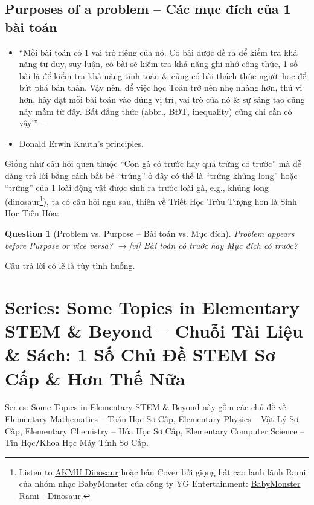 \documentclass[12pt,twoside]{book}
\newtheorem{question}{Question}
\begin{document}
\subsection{Purposes of a problem -- Các mục đích của 1 bài toán}

\begin{itemize}
	\item ``Mỗi bài toán có 1 vai trò riêng của nó. Có bài được đề ra để kiểm tra khả năng tư duy, suy luận, có bài sẽ kiểm tra khả năng ghi nhớ công thức, 1 số bài là để kiểm tra khả năng tính toán \& cũng có bài thách thức người học để bứt phá bản thân. Vậy nên, để việc học Toán trở nên nhẹ nhàng hơn, thú vị hơn, hãy đặt mỗi bài toán vào đúng vị trí, vai trò của nó \& sự sáng tạo cũng nảy mầm từ đây. Bất đẳng thức (abbr., BĐT, inequality) cũng chỉ cần có vậy!'' -- \cite[Lời nói đầu, p. 3]{Anh_Quang_bdt_lem}
	\item {\sc Donald Erwin Knuth}'s principles.
\end{itemize}
Giống như câu hỏi quen thuộc ``Con gà có trước hay quả trứng có trước'' mà dễ dàng trả lời bằng cách bắt bẻ ``trứng'' ở đây có thể là ``trứng khủng long'' hoặc ``trứng'' của 1 loài động vật được sinh ra trước loài gà, e.g., khủng long (dinosaur\footnote{Listen to \href{https://www.youtube.com/watch?v=8Oz7DG76ibY}{AKMU Dinosaur} hoặc bản Cover bởi giọng hát cao lanh lãnh {\sc Rami} của nhóm nhạc {\sc BabyMonster} của công ty YG Entertainment: \href{https://www.youtube.com/watch?v=ZBXTKTeaJcA}{{\sc BabyMonster Rami} - Dinosaur}.}), ta có câu hỏi ngu sau, thiên về Triết Học Trừu Tượng hơn là Sinh Học Tiến Hóa:

\begin{question}[Problem vs. Purpose -- Bài toán vs. Mục đích]
	Problem appears before Purpose or vice versa? {\sf[en]$\to$[vi]} Bài toán có trước hay Mục đích có trước?
\end{question}
Câu trả lời có lẽ là tùy tình huống. 


\section{Series: Some Topics in Elementary STEM \& Beyond -- Chuỗi Tài Liệu \& Sách: 1 Số Chủ Đề STEM Sơ Cấp \& Hơn Thế Nữa}
Series: Some Topics in Elementary STEM \& Beyond này gồm các chủ đề về Elementary Mathematics -- Toán Học Sơ Cấp, Elementary Physics -- Vật Lý Sơ Cấp, Elementary Chemistry -- Hóa Học Sơ Cấp, Elementary Computer Science -- Tin Học{\tt/}Khoa Học Máy Tính Sơ Cấp.
\end{document}
